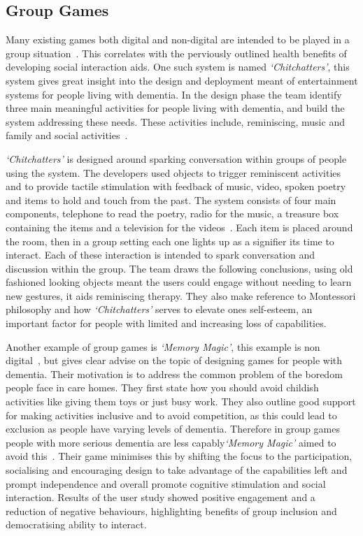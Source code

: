 \subsection{Group Games}
Many existing games both digital and non-digital are intended to be played in a group situation~\cite{Sterns2005, VanRijn2010, sterns2008human}.
This correlates with the perviously outlined health benefits of developing social interaction aids. 
One such system is named \emph{`Chitchatters'}, this system gives great insight into the design and deployment meant of entertainment systems for people living with dementia.
In the design phase the team identify three main meaningful activities for people living with dementia, and build the system addressing these needs. These activities include, reminiscing, music and family and social activities~\cite{VanRijn2010}.

\emph{`Chitchatters'} is designed around sparking conversation within groups of people using the system. 
The developers used objects to trigger reminiscent activities and to provide tactile stimulation with feedback of music, video, spoken poetry and items to hold and touch from the past. 
The system consists of four main components, telephone to read the poetry, radio for the music, a treasure box containing the items and a television for the videos~\cite{VanRijn2010}.
Each item is placed around the room, then in a group setting each one lights up as a signifier its time to interact.
Each of these interaction is intended to spark conversation and discussion within the group.
The team draws the following conclusions, using old fashioned looking objects meant the users could engage without needing to learn new gestures, it aids reminiscing therapy. They also make reference to Montessori philosophy and how \emph{`Chitchatters'} serves to elevate ones self-esteem, an important factor for people with limited and increasing loss of capabilities.

Another example of group games is \emph{`Memory Magic'}, this example is non digital~\cite{Sterns2005}, but gives clear advise on the topic of designing games for people with dementia. 
Their motivation is to address the common problem of the boredom people face in care homes. 
They first state how you should avoid childish activities like giving them toys or just busy work. 
They also outline good support for making activities inclusive and to avoid competition, as this could lead to exclusion as people have varying levels of dementia. 
Therefore in group games people with more serious dementia are less capably\emph{`Memory Magic'} aimed to avoid this~\cite{Sterns2005}.
Their game minimises this by shifting the focus to the participation, socialising and encouraging design to take advantage of the capabilities left and prompt independence and overall promote cognitive stimulation and social interaction. 
Results of the user study showed positive engagement and a reduction of negative behaviours, highlighting benefits of group inclusion and democratising ability to interact.

